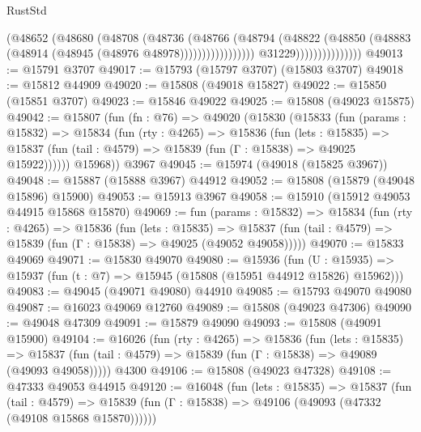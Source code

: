 \begin{lexlean}{RustStd}
\begin{coremodule}
                                            (@48652
                                              (@48680
                                                (@48708
                                                  (@48736
                                                    (@48766
                                                      (@48794
                                                        (@48822
                                                          (@48850
                                                            (@48883
                                                              (@48914
                                                                (@48945
                                                                  (@48976 @48978)))))))))))))))))
                                  @31229)))))))))))))))
@49013 := @15791 @3707
@49017 := @15793 (@15797 @3707) (@15803 @3707)
@49018 := @15812 @44909
@49020 := @15808 (@49018 @15827)
@49022 := @15850 (@15851 @3707)
@49023 := @15846 @49022
@49025 := @15808 (@49023 @15875)
@49042 := @15807
    (fun (fn : @76) =>
    @49020
      (@15830
        (@15833
          (fun (params : @15832) =>
          @15834
            (fun (rty : @4265) =>
            @15836
              (fun (lets : @15835) =>
              @15837 (fun (tail : @4579) => @15839 (fun (Γ : @15838) => @49025 @15922))))))
        @15968))
    @3967
@49045 := @15974 (@49018 (@15825 @3967))
@49048 := @15887 (@15888 @3967) @44912
@49052 := @15808 (@15879 (@49048 @15896) @15900)
@49053 := @15913 @3967
@49058 := @15910 (@15912 @49053 @44915 @15868 @15870)
@49069 := fun (params : @15832) =>
  @15834
    (fun (rty : @4265) =>
    @15836
      (fun (lets : @15835) =>
      @15837 (fun (tail : @4579) => @15839 (fun (Γ : @15838) => @49025 (@49052 @49058)))))
@49070 := @15833 @49069
@49071 := @15830 @49070
@49080 := @15936
    (fun (U : @15935) => @15937 (fun (t : @7) => @15945 (@15808 (@15951 @44912 @15826) @15962)))
@49083 := @49045 (@49071 @49080) @44910
@49085 := @15793 @49070 @49080
@49087 := @16023 @49069 @12760
@49089 := @15808 (@49023 @47306)
@49090 := @49048 @47309
@49091 := @15879 @49090
@49093 := @15808 (@49091 @15900)
@49104 := @16026
    (fun (rty : @4265) =>
    @15836
      (fun (lets : @15835) =>
      @15837 (fun (tail : @4579) => @15839 (fun (Γ : @15838) => @49089 (@49093 @49058)))))
    @4300
@49106 := @15808 (@49023 @47328)
@49108 := @47333 @49053 @44915
@49120 := @16048
    (fun (lets : @15835) =>
    @15837
      (fun (tail : @4579) =>
      @15839 (fun (Γ : @15838) => @49106 (@49093 (@47332 (@49108 @15868 @15870))))))

\end{coremodule}
\end{lexlean}
